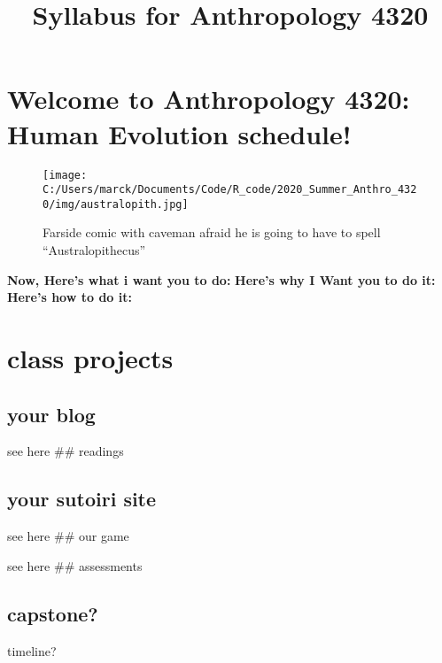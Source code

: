 \documentclass[]{tufte-handout}
\title{Syllabus for Anthropology 4320}
\date{}
\begin{document}
\maketitle




\hypertarget{welcome-to-anthropology-4320-human-evolution-schedule}{%
\section{Welcome to Anthropology 4320: Human Evolution
schedule!}\label{welcome-to-anthropology-4320-human-evolution-schedule}}

\begin{figure}
\centering
\texttt{[image: C:/Users/marck/Documents/Code/R\_code/2020\_Summer\_Anthro\_4320/img/australopith.jpg]}
\caption{Farside comic with caveman afraid he is going to have to spell
``Australopithecus''}
\end{figure}

\begin{marginfigure}
\textbf{Now, Here's what i want you to do:} \textbf{Here's why I Want
you to do it:} \textbf{Here's how to do it:}
\end{marginfigure}

\hypertarget{class-projects}{%
\section{class projects}\label{class-projects}}

\hypertarget{your-blog}{%
\subsection{your blog}\label{your-blog}}

see here \#\# readings

\hypertarget{your-sutoiri-site}{%
\subsection{your sutoiri site}\label{your-sutoiri-site}}

see here \#\# our game

see here \#\# assessments

\hypertarget{capstone}{%
\subsection{capstone?}\label{capstone}}

timeline?
\end{document}
